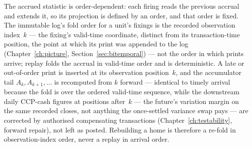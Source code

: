 The accrued statistic is order-dependent: each firing reads the previous accrual and
extends it, so its projection is defined by an order, and that order is fixed. The
immutable log's fold order for a unit's fixings is the recorded observation index~$k$ ---
the fixing's valid-time coordinate, distinct from its transaction-time position, the point
at which its print was appended to the log (Chapter~\ref{ch:picture},
Section~\ref{sec:bitemporal}) --- not the order in which prints arrive; replay folds the
accrual in valid-time order and is deterministic. A late or out-of-order print is inserted
at its observation position~$k$, and the accumulator tail $A_{k},A_{k+1},\dots$ is
recomputed from $k$ forward --- identical to timely arrival because the fold is over the
ordered valid-time sequence,
while the downstream daily CCP-cash figures at positions after~$k$ --- the future's
variation margin on the same recorded closes, not anything the once-settled variance swap
pays --- are corrected by authorised compensating transactions
(Chapter~\ref{ch:testability}, forward repair), not left as posted. Rebuilding a home is therefore a re-fold in
observation-index order, never a replay in arrival order.
